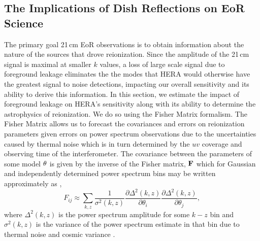 \documentclass[twocolumn]{emulateapj}
\begin{document}
\subsection{The Implications of Dish Reflections on EoR Science}\label{ssec:Science}
The primary goal 21\,cm EoR observations is to obtain information about the nature of the sources that drove reionization. Since the amplitude of the 21\,cm signal is maximal at smaller $k$ values, a loss of large scale signal due to foreground leakage eliminates the the modes that HERA would otherwise have the greatest signal to noise detections, impacting our overall sensitivity and its ability to derive this information. In this section, we estimate the impact of foreground leakage on HERA's sensitivity along with its ability to determine the astrophysics of reionization. We do so using the Fisher Matrix formalism. The Fisher Matrix allows us to forecast the covariances and errors on reionization parameters given errors on power spectrum observations due to the uncertainties caused by thermal noise which is in turn determined by the $uv$ coverage and observing time of the interferometer. The covariance between the parameters of some model ${\bf \theta}$ is given by the inverse of the Fisher matrix, ${\bf F}$ which for Gaussian and independently determined power spectrum bins may be written approximately as \citep{Pober:2014,EwallWice:2015a},
\begin{equation}\label{eq:Fisher}
F_{ij} \approx \sum_{k,z} \frac{1}{\sigma^2(k,z)} \frac{\partial \Delta^2(k,z)}{\partial \theta_i} \frac{\partial \Delta^2(k,z)}{\partial \theta_j},
\end{equation}
where $\Delta^2(k,z)$ is the power spectrum amplitude for some $k-z$ bin and $\sigma^2(k,z)$ is the variance of the power spectrum estimate in that bin due to thermal noise and cosmic variance \citep{Beardsley:2013}. 
\end{document}
